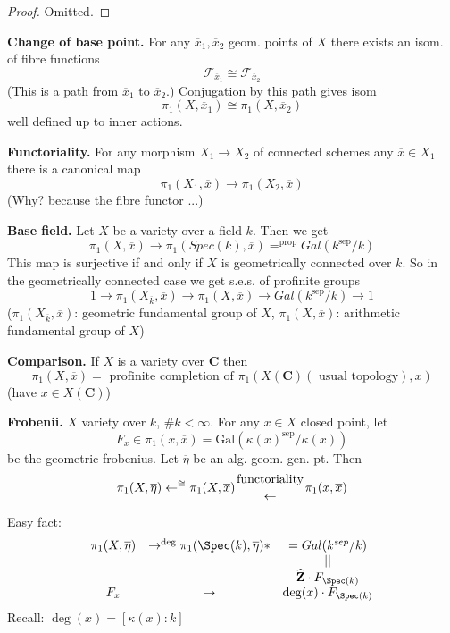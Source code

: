 \begin{proof}
Omitted.
\end{proof}

\noindent
{\bf Change of base point.} For any $\overline{x}_1, \overline{x}_2$
geom. points of $X$ there exists an isom. of fibre functions
$$
\mathcal{F}_{\overline{x}_1} \cong \mathcal{F}_{\overline{x}_2}
$$
(This is a path from $\overline{x}_1$ to $\overline{x}_2$.) Conjugation
by this path gives isom
$$
\pi_1(X, \overline{x}_1) \cong \pi_1(X, \overline{x}_2)
$$
well defined up to inner actions.

\medskip\noindent
{\bf Functoriality.} For any morphism $X_1\to X_2$ of connected schemes
any $\overline{x}\in X_1$ there is a canonical map
$$
\pi_1(X_1, \overline{x}) \to \pi_1(X_2, \overline{x})
$$
(Why? because the fibre functor ...)

\medskip\noindent
{\bf Base field.} Let $X$ be a variety over a field $k$. Then we get
$$
\pi_1(X, \overline{x}) \to
\pi_1(Spec(k), \overline{x}) =^{\text{prop}} Gal(k^{\text{sep}}/k)
$$
This map is surjective if and only if $X$ is geometrically connected over $k$.
So in the geometrically connected case we get s.e.s. of profinite
groups
$$
1 \to \pi_1(X_{\overline{k}}, \overline{x}) \to
\pi_1(X, \overline{x}) \to
Gal(k^{\text{sep}}/k) \to 1
$$
($\pi_1(X_{\overline{k}}, \overline{x})$: geometric fundamental group of
$X$, $\pi_1(X, \overline{x})$: arithmetic fundamental group of $X$)

\medskip\noindent
{\bf Comparison.} If $X$ is a variety over $\mathbf{C}$ then
$$
\pi_1(X, \overline{x}) =
\text{ profinite completion of }
\pi_1(X(\mathbf{C})(\text{ usual topology}), x)
$$
(have $x\in X(\mathbf{C})$)

\medskip\noindent
{\bf Frobenii.} $X$ variety over $k$, $\# k < \infty$. For any $x \in X$
closed point, let
$$
F_x\in \pi_1(x, \overline{x}) =
\text{Gal}(\kappa(x)^{\text{sep}}/\kappa(x))
$$
be the geometric frobenius.
Let $\overline\eta$ be an alg. geom. gen. pt. Then
$$
\pi_1(X, \overline\eta) \leftarrow^{\cong}
\pi_1(X, \overline{x})
{\text{functoriality} \atop \leftarrow} \pi_1(x, \overline{x})
$$

\noindent
Easy fact:
$$
\begin{matrix}
\pi_1(X, \overline \eta) & \to^{\deg} \pi_1(\Spec(k), \overline \eta) * &
= Gal(k^{sep}/k) \\
& & || \\
& & \widehat{\mathbf{Z}}\cdot F_{\Spec(k)} \\
F_x & \mapsto & \deg(x)\cdot F_{\Spec(k)}
\end{matrix}
$$
Recall: $\deg(x) = [\kappa(x):k]$


